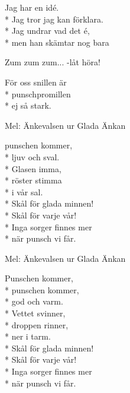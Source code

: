 \begin{SongText}
\begin{SongVerse}
    \end{SongVerse}
    \begin{SongVerse}
        Jag har en idé.\\*%
        Jag tror jag kan förklara.\\*%
        Jag undrar vad det é,\\*%
        men han skämtar nog bara
    \end{SongVerse}
    \begin{SongVerse}
        Zum zum zum... -låt höra!
    \end{SongVerse}
    \begin{SongVerse}
        För oss snillen är\\*%
        punschpromillen\\*%
        ej så stark.
    \end{SongVerse}\end{SongText}
\begin{SongText}
    \begin{SongInfo}
        Mel: Änkevalsen ur Glada Änkan
    \end{SongInfo}
    \begin{SongVerse}
        punschen kommer,\\*%
        ljuv och sval.\\*%
        Glasen imma,\\*%
        röster stimma\\*%
        i vår sal.\\*%
        Skål för glada minnen!\\*%
        Skål för varje vår!\\*%
        Inga sorger finnes mer\\*%
        när punsch vi får.
    \end{SongVerse}\end{SongText}
\begin{SongText}
    \begin{SongInfo}
        Mel: Änkevalsen ur Glada Änkan
    \end{SongInfo}
    \begin{SongVerse}
        Punschen kommer,\\*%
        punschen kommer,\\*%
        god och varm.\\*%
        Vettet svinner,\\*%
        droppen rinner,\\*%
        ner i tarm.\\*%
        Skål för glada minnen!\\*%
        Skål för varje vår!\\*%
        Inga sorger finnes mer\\*%
        när punsch vi får.
    \end{SongVerse}\end{SongText}
